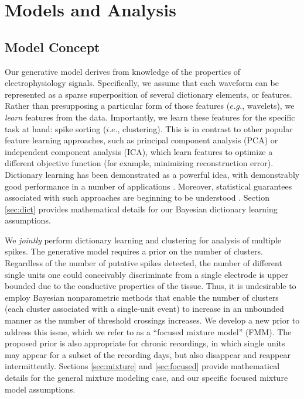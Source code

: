 \documentclass[journal]{IEEEtran}
\begin{document}
\section{Models and Analysis\label{sec:models}}

\subsection{Model Concept} %
\label{sub:concept1}

Our generative model derives from knowledge of the properties of electrophysiology signals.  
Specifically, we assume that each waveform can be represented as a sparse superposition of several dictionary elements, or features.  Rather than presupposing a particular form of those features ($e.g.$, wavelets), we \emph{learn} features from the data.  Importantly, we learn these features for the specific task at hand: spike sorting ($i.e.$, clustering).  This is in contrast to other popular feature learning approaches, such as principal component analysis (PCA) or independent component analysis (ICA), which learn features to optimize a different objective function (for example, minimizing reconstruction error). Dictionary learning has been demonstrated as a powerful idea, with demonstrably good performance in a number of applications \cite{Zhou2012}.  Moreover, statistical guarantees associated with such approaches are beginning to be understood \cite{Spielman2012}.  Section \ref{sec:dict} provides mathematical details for our Bayesian dictionary learning assumptions.

We \emph{jointly} perform dictionary learning and clustering for analysis of multiple spikes.
The generative model requires a prior on the number of clusters.  Regardless of the number of putative spikes detected, the number of different single units one could conceivably discriminate from a single electrode is upper bounded due to the conductive properties of the tissue.  Thus, it is undesirable to employ Bayesian nonparametric methods \cite{Antoniak74} that enable the number of clusters (each cluster associated with a single-unit event) to increase in an unbounded manner as the number of threshold crossings increases. We develop a new prior to address this issue, which we refer to as a ``focused mixture model'' (FMM). The proposed prior is also appropriate for chronic recordings, in which single units may appear for a subset of the recording days, but also disappear and reappear intermittently. Sections \ref{sec:mixture} and \ref{sec:focused} provide mathematical details for the general mixture modeling case, and our specific focused mixture model assumptions.
\end{document}
